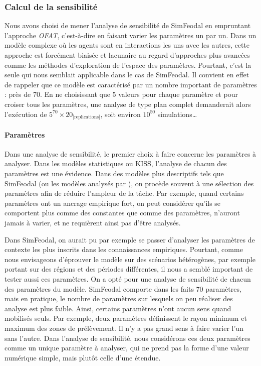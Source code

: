 \subsubsection{Calcul de la sensibilité}

Nous avons choisi de mener l'analyse de sensibilité de SimFeodal en empruntant l'approche \textit{OFAT}, c'est-à-dire en faisant varier les paramètres un par un.
Dans un modèle complexe où les agents sont en interactions les uns avec les autres, cette approche est forcément biaisée et lacunaire au regard d'approches plus avancées comme les méthodes d'exploration de l'espace des paramètres.
Pourtant, c'est la seule qui nous semblait applicable dans le cas de SimFeodal.
Il convient en effet de rappeler que ce modèle est caractérisé par un nombre important de paramètres : près de 70.
En ne choisissant que 5 valeurs pour chaque paramètre et pour croiser tous les paramètres, une analyse de type plan complet demanderait alors l'exécution de $5^{70} \times 20_{\text{[replications]}}$, soit environ $10^{50}$ simulations\ldots

\paragraph{Paramètres}

Dans une analyse de sensibilité, le premier choix à faire concerne les paramètres à analyser.
Dans les modèles statistiques ou KISS, l'analyse de chacun des paramètres est une évidence.
Dans des modèles plus descriptifs tels que SimFeodal (ou les modèles analysés par \textcite{hirtzel2015exploration}), on procède souvent à une sélection des paramètres afin de réduire l'ampleur de la tâche.
Par exemple, quand certains paramètres ont un ancrage empirique fort, on peut considérer qu'ils se comportent plus comme des constantes que comme des paramètres, n'auront jamais à varier, et ne requièrent ainsi pas d'être analysés.

Dans SimFeodal, on aurait pu par exemple se passer d'analyser les paramètres de contexte les plus inscrits dans les connaissances empiriques.
Pourtant, comme nous envisageons d'éprouver le modèle sur des scénarios hétérogènes, par exemple portant sur des régions et des périodes différentes, il nous a semblé important de tester aussi ces paramètres.
On a opté pour une analyse de sensibilité de chacun des paramètres du modèle.
SimFeodal comporte dans les faits 70 paramètres, mais en pratique, le nombre de paramètres sur lesquels on peu réaliser des analyse est plus faible.
Ainsi, certains paramètres n'ont aucun sens quand mobilisés seuls.
Par exemple, deux paramètres définissent le rayon minimum et maximum des zones de prélèvement.
Il n'y a pas grand sens à faire varier l'un sans l'autre.
Dans l'analyse de sensibilité, nous considérons ces deux paramètres comme un unique paramètre à analyser, qui ne prend pas la forme d'une valeur numérique simple, mais plutôt celle d'une étendue.

